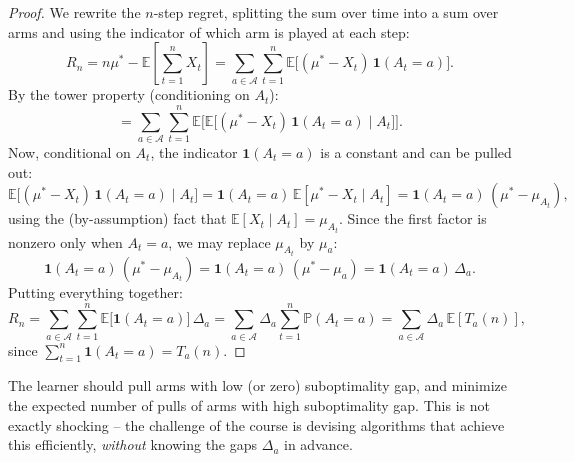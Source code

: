 \begin{proof}
We rewrite the $n$-step regret, splitting the sum over time into a sum over arms and using the indicator of which arm is played at each step:
\[
R_n = n\mu^* - \mathbb{E}\left[\sum_{t=1}^n X_t\right] = \sum_{a \in \mathcal{A}} \sum_{t=1}^n \mathbb{E}\big[(\mu^* - X_t)\,\mathbf{1}(A_t = a)\big].
\]
By the tower property (conditioning on $A_t$):
\[
= \sum_{a \in \mathcal{A}} \sum_{t=1}^n \mathbb{E}\Big[\mathbb{E}\big[(\mu^* - X_t)\,\mathbf{1}(A_t = a) \mid A_t\big]\Big].
\]
Now, conditional on $A_t$, the indicator $\mathbf{1}(A_t = a)$ is a constant and can be pulled out:
\[
\mathbb{E}\big[(\mu^* - X_t)\,\mathbf{1}(A_t = a) \mid A_t\big] = \mathbf{1}(A_t = a)\,\mathbb{E}[\mu^* - X_t \mid A_t] = \mathbf{1}(A_t = a)\,(\mu^* - \mu_{A_t}),
\]
using the (by-assumption) fact that $\mathbb{E}[X_t \mid A_t] = \mu_{A_t}$. Since the first factor is nonzero only when $A_t = a$, we may replace $\mu_{A_t}$ by $\mu_a$:
\[
\mathbf{1}(A_t = a)\,(\mu^* - \mu_{A_t}) = \mathbf{1}(A_t = a)\,(\mu^* - \mu_a) = \mathbf{1}(A_t = a)\,\Delta_a.
\]
Putting everything together:
\[
R_n = \sum_{a \in \mathcal{A}} \sum_{t=1}^n \mathbb{E}\big[\mathbf{1}(A_t = a)\big]\,\Delta_a = \sum_{a \in \mathcal{A}} \Delta_a \sum_{t=1}^n \mathbb{P}(A_t = a) = \sum_{a \in \mathcal{A}} \Delta_a\, \mathbb{E}[T_a(n)],
\]
since $\sum_{t=1}^n \mathbf{1}(A_t = a) = T_a(n)$.
\end{proof}

\begin{remark}[Intuition]
The learner should pull arms with low (or zero) suboptimality gap, and minimize the expected number of pulls of arms with high suboptimality gap. This is not exactly shocking -- the challenge of the course is devising algorithms that achieve this efficiently, \emph{without} knowing the gaps $\Delta_a$ in advance.
\end{remark}
